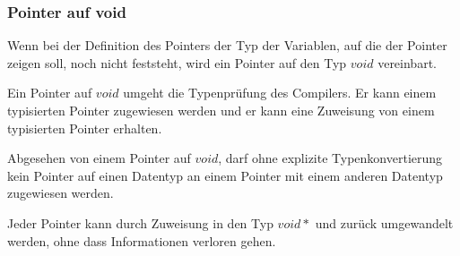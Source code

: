 	\subsubsection{Pointer auf void}
		\begin{compactitem}
			\item Wenn bei der Definition des Pointers der Typ der Variablen, auf die der Pointer zeigen soll, noch nicht feststeht, wird ein Pointer auf den Typ $void$ vereinbart.
			\item Ein Pointer auf $void$ umgeht die Typenprüfung des Compilers. Er kann einem typisierten Pointer zugewiesen werden und er kann eine Zuweisung von einem typisierten Pointer erhalten.
			\item Abgesehen von einem Pointer auf $void$, darf ohne explizite Typenkonvertierung kein Pointer auf einen Datentyp an einem Pointer mit einem anderen Datentyp zugewiesen werden.
			\item Jeder Pointer kann durch Zuweisung in den Typ $void*$ und zurück umgewandelt werden, ohne dass Informationen verloren gehen.
		\end{compactitem}
		
